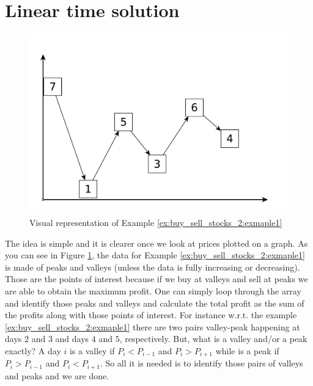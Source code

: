 

\section{Linear time solution}
\label{buy_sell_stocks_2:sec:linear}
\begin{figure}
	\centering
	\includegraphics[width=\textwidth]{sources/buy_sell_stocks/buy_sell_stocks_2/images/bars4}
	\caption[]{Visual representation of Example \ref{ex:buy_sell_stocks_2:exmaple1}}
	\label{fig:buy_sell_stocks_2:example1}
\end{figure}


The idea is simple and it is clearer once we look at prices plotted on a graph. As you can see in Figure \ref{fig:buy_sell_stocks_2:example1}, the data  for Example \ref{ex:buy_sell_stocks_2:exmaple1} is made of peaks and valleys (unless the data is fully increasing or decreasing). Those are the points of interest because if we buy at valleys and sell at peaks we are able to obtain the maximum profit. 
One can simply loop through the array and identify those peaks and valleys and calculate the total profit as the sum of the profits along with those points of interest. 
For instance w.r.t. the example \ref{ex:buy_sell_stocks_2:exmaple1} there are two pairs  valley-peak happening at days $2$ and $3$ and days $4$ and $5$, respectively. 
But, what is a valley and/or a peak exactly?
A day $i$ is a valley if $P_i < P_{i-1}$ and $P_i > P_{i+1}$
while is a peak if $P_i > P_{i-1}$ and $P_i < P_{i+1}$.
So all it is needed is to identify those pairs of valleys and peaks and we are done. 

